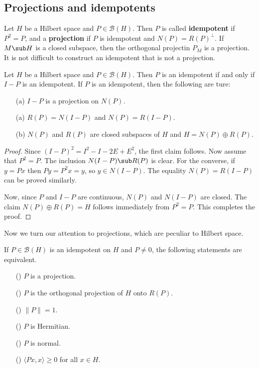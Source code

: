 \subsection{Projections and idempotents}
Let $H$ be a Hilbert space and $P\in\mathcal{B}(H)$. Then $P$ is called \textbf{idempotent} if $P^2=P$, and a \textbf{projection} if $P$ is idempotent and $N(P)=R(P)^\bot$. If $M\sub H$ is a closed subspace, then the orthogonal projectin $P_M$ is a projection. It is not difficult to construct an idempotent that is not a projection.
\begin{proposition}
Let $H$ be a Hilbert space and $P\in\mathcal{B}(H)$. Then $P$ is an idempotent if and only if $I-P$ is an idempotent. If $P$ is an idempotent, then the following are ture:
\begin{itemize}
\item[(a)] $I-P$ is a projection on $N(P)$.
\item[(a)] $R(P)=N(I-P)$ and $N(P)=R(I-P)$.
\item[(b)] $N(P)$ and $R(P)$ are closed subspaces of $H$ and $H=N(P)\oplus R(P)$.
\end{itemize}
\end{proposition}
\begin{proof}
Since $(I-P)^2=I^2-I-2E+E^2$, the first claim follows. Now assume that $P^2=P$. The inclusion $N(I-P)\sub R(P)$ is clear. For the converse, if $y=Px$ then $Py=P^2x=y$, so $y\in N(I-P)$. The equality $N(P)=R(I-P)$ can be proved similarly.\par
Now, since $P$ and $I-P$ are continuous, $N(P)$ and $N(I-P)$ are closed. The claim $N(P)\oplus R(P)=H$ follows immediately from $P^2=P$. This completes the proof.
\end{proof}
Now we turn our attention to projections, which are peculiar to Hilbert space.
\begin{proposition}\label{Hilbert space idempotent is projection iff}
If $P\in\mathcal{B}(H)$ is an idempotent on $H$ and $P\neq 0$, the following statements are equivalent.
\begin{itemize}
\item[(\rmnum{1})] $P$ is a projection.
\item[(\rmnum{2})] $P$ is the orthogonal projection of $H$ onto $R(P)$.
\item[(\rmnum{3})] $\|P\|=1$.
\item[(\rmnum{4})] $P$ is Hermitian.
\item[(\rmnum{5})] $P$ is normal.
\item[(\rmnum{6})] $\langle Px,x\rangle\geq 0$ for all $x\in H$.
\end{itemize}
\end{proposition}
